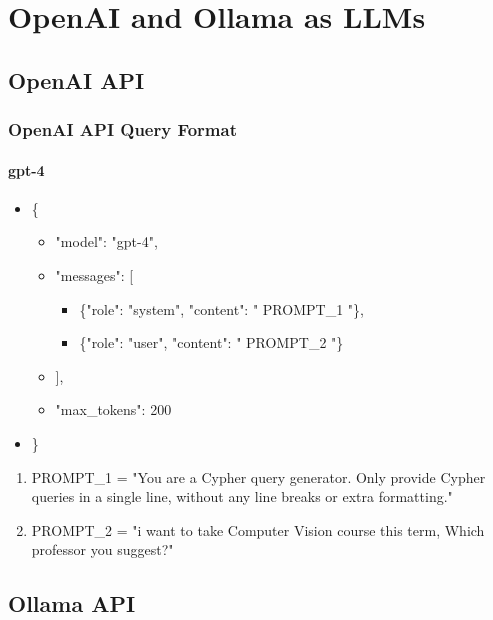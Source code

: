\documentclass[
	11pt, %
]{beamer}
\begin{document}
\section{OpenAI and Ollama as LLMs}

\subsection{OpenAI API}

\begin{frame}
	\frametitle{OpenAI API Query Format}
	\framesubtitle{gpt-4} %
	
	\begin{itemize}
		\item \{
		\begin{itemize}
			\item "model": "gpt-4",
			\item "messages": [
				\begin{itemize}
					\item 	    \{"role": "system", "content": " PROMPT\_1 "\},
										\item 	    \{"role": "user", "content": " PROMPT\_2 "\}
				\end{itemize}
			\item ],
			\item   "max\_tokens": 200
		\end{itemize}
		\item \}
	\end{itemize}
	
	\bigskip %
	
	\begin{enumerate}
		\item PROMPT\_1 = "You are a Cypher query generator. Only provide Cypher queries in a single line, without any line breaks or extra formatting."
		\item PROMPT\_2 = "i want to take Computer Vision course this term, Which professor you suggest?"
	\end{enumerate}
\end{frame}


\subsection{Ollama API}
\end{document}
